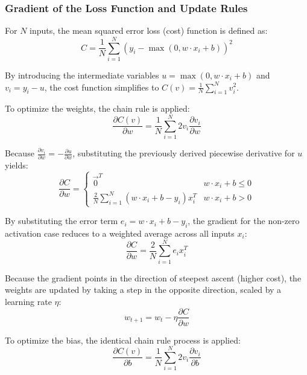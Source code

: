 \documentclass[conference]{IEEEtran}
\begin{document}
\subsubsection{Gradient of the Loss Function and Update Rules}
For $N$ inputs, the mean squared error loss (cost) function is defined as:
\begin{equation}
C = \frac{1}{N} \sum_{i=1}^N (y_i - \max(0, w \cdot x_i + b))^2
\end{equation}

By introducing the intermediate variables $u = \max(0, w \cdot x_i + b)$ and $v_i = y_i - u$, the cost function simplifies to $C(v) = \frac{1}{N} \sum_{i=1}^N v_i^2$. 

To optimize the weights, the chain rule is applied:
\begin{equation}
\frac{\partial C(v)}{\partial w} = \frac{1}{N} \sum_{i=1}^N 2v_i \frac{\partial v_i}{\partial w}
\end{equation}

Because $\frac{\partial v_i}{\partial w} = -\frac{\partial u}{\partial w}$, substituting the previously derived piecewise derivative for $u$ yields:
\begin{equation}
\frac{\partial C}{\partial w} = 
\begin{cases} 
\vec{0}^T & w \cdot x_i + b \le 0 \\ 
\frac{2}{N} \sum_{i=1}^N (w \cdot x_i + b - y_i) x_i^T & w \cdot x_i + b > 0 
\end{cases}
\end{equation}

By substituting the error term $e_i = w \cdot x_i + b - y_i$, the gradient for the non-zero activation case reduces to a weighted average across all inputs $x_i$:
\begin{equation}
\frac{\partial C}{\partial w} = \frac{2}{N} \sum_{i=1}^N e_i x_i^T
\end{equation}

Because the gradient points in the direction of steepest ascent (higher cost), the weights are updated by taking a step in the opposite direction, scaled by a learning rate $\eta$:
\begin{equation}
w_{t+1} = w_t - \eta \frac{\partial C}{\partial w}
\end{equation}

To optimize the bias, the identical chain rule process is applied:
\begin{equation}
\frac{\partial C(v)}{\partial b} = \frac{1}{N} \sum_{i=1}^N 2v_i \frac{\partial v_i}{\partial b}
\end{equation}
\end{document}
